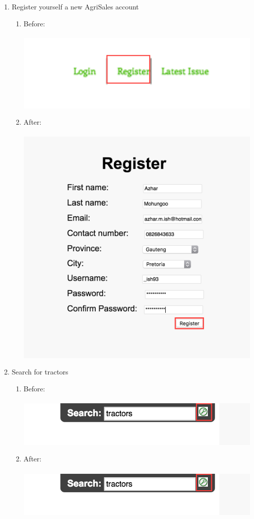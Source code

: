 \documentclass[11pt]{article}
\begin{document}
\begin{enumerate}
\begin{enumerate}
			\end{enumerate} \newpage
		\item Register yourself a new AgriSales account
			\begin{enumerate}
				\item Before: \\ \\
					\includegraphics[width=0.7\linewidth]{../Images/Tasks/Task3Before}
				\item After: \\ \\
					\includegraphics[width=0.5\linewidth]{../Images/Tasks/Task3After}
			\end{enumerate}
		\item Search for tractors
			\begin{enumerate}
				\item Before: \\ \\
					\includegraphics[width=0.8\linewidth]{../Images/Tasks/Task4Before}
				\item After: \\ \\
					\includegraphics[width=0.5\linewidth]{../Images/Tasks/Task4Before}

\end{enumerate}
\end{enumerate}
\end{document}
